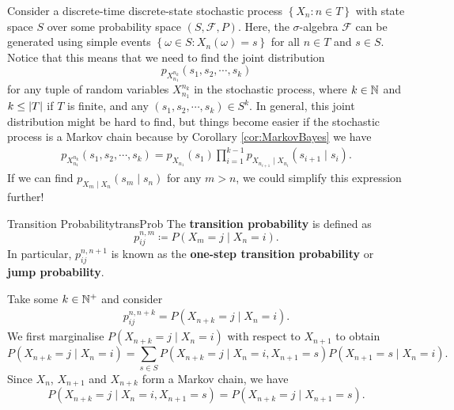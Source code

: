 \documentclass[math, code]{amznotes}
\theoremstyle{remark}
\begin{document}
Consider a discrete-time discrete-state stochastic process $\left\{X_n \colon n \in T\right\}$ with state space $S$ over some probability space $\left(S, \mathcal{F}, P\right)$. Here, the $\sigma$-algebra $\mathcal{F}$ can be generated using simple events $\left\{\omega \in S \colon X_n\left(\omega\right) = s\right\}$ for all $n \in T$ and $s \in S$. Notice that this means that we need to find the joint distribution 
\begin{equation*}
    p_{X_{n_1}^{n_k}}\left(s_1, s_2, \cdots, s_k\right)
\end{equation*}
for any tuple of random variables $X_{n_1}^{n_k}$ in the stochastic process, where $k \in \mathbb{N}$ and $k \leq {\left\lvert {T} \right\rvert}$ if $T$ is finite, and any $\left(s_1, s_2, \cdots, s_k\right) \in S^k$. In general, this joint distribution might be hard to find, but things become easier if the stochastic process is a Markov chain because by Corollary \ref{cor:MarkovBayes} we have
\begin{align*}
    p_{X_{n_1}^{n_k}}\left(s_1, s_2, \cdots, s_k\right) = p_{X_{n_1}}\left(s_1\right)\prod_{i = 1}^{k - 1}p_{X_{n_{i + 1}} \mid X_{n_i}}\left(s_{i + 1} \mid s_i\right).
\end{align*}
If we can find $p_{X_m \mid X_n}\left(s_m \mid s_n\right)$ for any $m > n$, we could simplify this expression further! 
\begin{dfnbox}{Transition Probability}{transProb}
    The {\color{red} \textbf{transition probability}} is defined as 
    \begin{equation*}
        p_{ij}^{n, m} \coloneqq P\left(X_{m} = j \mid X_n = i\right).
    \end{equation*}
    In particular, $p_{ij}^{n, n + 1}$ is known as the {\color{red} \textbf{one-step transition probability}} or {\color{red} \textbf{jump probability}}.
\end{dfnbox}
Take some $k \in \mathbb{N}^+$ and consider
\begin{align*}
    p_{ij}^{n, n + k} = P\left(X_{n + k} = j \mid X_n = i\right).
\end{align*}
We first marginalise $P\left(X_{n + k} = j \mid X_n = i\right)$ with respect to $X_{n + 1}$ to obtain
\begin{equation*}
    P\left(X_{n + k} = j \mid X_n = i\right) = \sum_{s \in S}P\left(X_{n + k} = j \mid X_n = i, X_{n + 1} = s\right)P\left(X_{n + 1} = s \mid X_n = i\right).
\end{equation*}
Since $X_n$, $X_{n + 1}$ and $X_{n + k}$ form a Markov chain, we have
\begin{equation*}
    P\left(X_{n + k} = j \mid X_n = i, X_{n + 1} = s\right) = P\left(X_{n + k} = j \mid X_{n + 1} = s\right).
\end{equation*}
\end{document}
